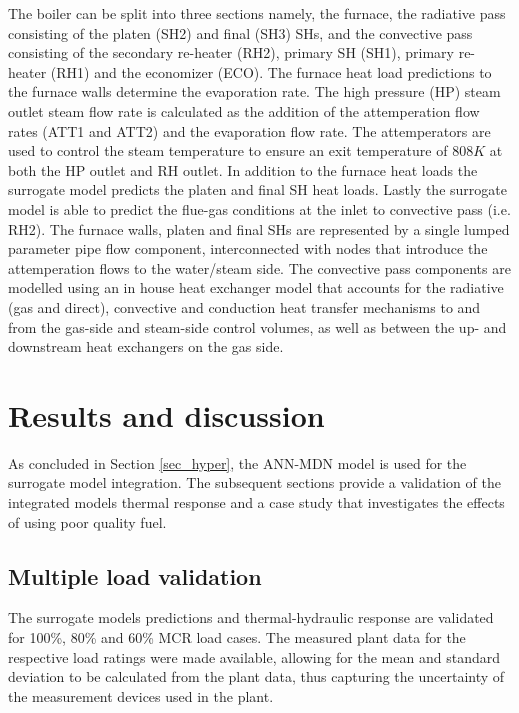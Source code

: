 \documentclass[a4paper,fleqn]{cas-dc}
\begin{document}
The boiler can be split into three sections namely, the furnace, the radiative pass consisting of the platen (SH2) and final (SH3) SHs, and the convective pass consisting of the secondary re-heater (RH2), primary SH (SH1), primary re-heater (RH1) and the economizer (ECO). The furnace heat load predictions to the furnace walls determine the evaporation rate. The high pressure (HP) steam outlet steam flow rate is calculated as the addition of the attemperation flow rates (ATT1 and ATT2) and the evaporation flow rate. The attemperators are used to control the steam temperature to ensure an exit temperature of $808K$ at both the HP outlet and RH outlet. In addition to the furnace heat loads the surrogate model predicts the platen and final SH heat loads. Lastly the surrogate model is able to predict the flue-gas conditions at the inlet to convective pass (i.e. RH2). The furnace walls, platen and final SHs are represented by a single lumped parameter pipe flow component, interconnected with nodes that introduce the attemperation flows to the water/steam side. The convective pass components are modelled using an in house heat exchanger model that accounts for the radiative (gas and direct), convective and conduction heat transfer mechanisms to and from the gas-side and steam-side control volumes, as well as between the up- and downstream heat exchangers on the gas side.

\section{Results and discussion}\label{sec_results_diss}
As concluded in Section \ref{sec_hyper}, the ANN-MDN model is used for the surrogate model integration. The subsequent sections provide a validation of the integrated models thermal response and a case study that investigates the effects of using poor quality fuel. 

\subsection{Multiple load validation}\label{sec_result_1}
The surrogate models predictions and thermal-hydraulic response are validated for 100\%, 80\% and 60\% MCR load cases. The measured plant data for the respective load ratings were made available, allowing for the mean and standard deviation to be calculated from the plant data, thus capturing the uncertainty of the measurement devices used in the plant.\\ 
\end{document}

